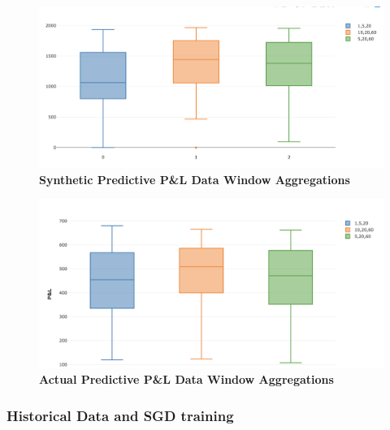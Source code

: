 \documentclass[a4paper,11pt,oneside]{article}
\theoremstyle{plain}
\theoremstyle{definition}
\begin{document}
\begin{figure}[H]
	\centering 
	\includegraphics[scale=0.3]{images/iteration_four/it4_ffn_deltas.png}
	\caption{\textbf{Synthetic Predictive P\&L Data Window Aggregations} 
		\newline }
	\label{figure-it5_ffn_deltas}
\end{figure}

\begin{figure}[H]
	\centering 
	\includegraphics[scale=0.3]{images/results/data/ffn_pl_actual.png}
	\caption{\textbf{Actual Predictive P\&L Data Window Aggregations} 
		\newline }
	\label{figure-results_pl_deltas_actual}
\end{figure}




\subsubsection{Historical Data and SGD training}


\end{document}
